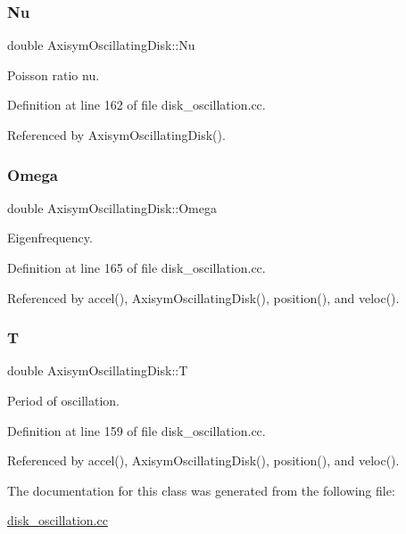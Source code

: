 \subsubsection{\texorpdfstring{Nu}{Nu}}
{\footnotesize\ttfamily double Axisym\+Oscillating\+Disk\+::\+Nu\hspace{0.3cm}{\ttfamily [private]}}



Poisson ratio nu. 



Definition at line 162 of file disk\+\_\+oscillation.\+cc.



Referenced by Axisym\+Oscillating\+Disk().

\mbox{\label{classAxisymOscillatingDisk_ab0ae3a1a7324dd0ccce15fd84471e3d1}} 
\subsubsection{\texorpdfstring{Omega}{Omega}}
{\footnotesize\ttfamily double Axisym\+Oscillating\+Disk\+::\+Omega\hspace{0.3cm}{\ttfamily [private]}}



Eigenfrequency. 



Definition at line 165 of file disk\+\_\+oscillation.\+cc.



Referenced by accel(), Axisym\+Oscillating\+Disk(), position(), and veloc().

\mbox{\label{classAxisymOscillatingDisk_a7789dcf51ef2e2eb6e5eaa826f404da1}} 
\subsubsection{\texorpdfstring{T}{T}}
{\footnotesize\ttfamily double Axisym\+Oscillating\+Disk\+::T\hspace{0.3cm}{\ttfamily [private]}}



Period of oscillation. 



Definition at line 159 of file disk\+\_\+oscillation.\+cc.



Referenced by accel(), Axisym\+Oscillating\+Disk(), position(), and veloc().



The documentation for this class was generated from the following file\+:\begin{DoxyCompactItemize}
\item 
\hyperlink{disk__oscillation_8cc}{disk\+\_\+oscillation.\+cc}\end{DoxyCompactItemize}
